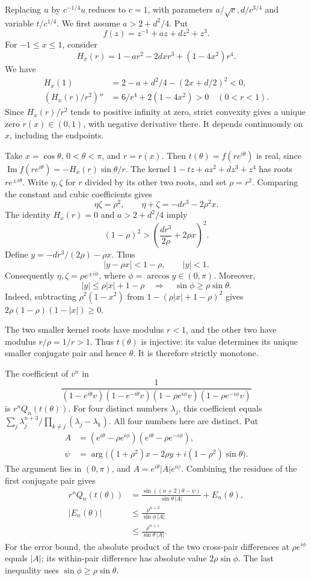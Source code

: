 \begin{proof*}
Replacing $u$ by $c^{-1/4}u$ reduces to $c=1$,
with parameters $a/\sqrt c,d/c^{3/4}$ and variable $t/c^{1/4}$.
We first assume $a>2+d^2/4$. Put
\[
 f(z)=z^{-1}+az+dz^2+z^3.
\]
For $-1\leq x\leq1$, consider
\[
 H_x(r)=1-ar^2-2dxr^3+(1-4x^2)r^4.
\]
We have
\begin{align*}
 H_x(1)&=2-a+d^2/4-(2x+d/2)^2<0,\\
 (H_x(r)/r^2)''&=6/r^4+2(1-4x^2)>0\quad(0<r<1).
\end{align*}
Since $H_x(r)/r^2$ tends to positive infinity at zero, strict convexity
gives a unique zero $r(x)\in(0,1)$, with negative derivative there.
It depends continuously on $x$, including the endpoints.

Take $x=\cos\theta$, $0<\theta<\pi$, and $r=r(x)$.
Then $t(\theta)=f(re^{i\theta})$ is real, since
$\operatorname{Im}f(re^{i\theta})=-H_x(r)\sin\theta/r$.
The kernel $1-tz+az^2+dz^3+z^4$ has roots $re^{\pm i\theta}$.
Write $\eta,\zeta$ for $r$ divided by its other two roots, and set
$\rho=r^2$. Comparing the constant and cubic coefficients gives
\[
 \eta\zeta=\rho^2,\qquad
 \eta+\zeta=-dr^3-2\rho^2x.
\]
The identity $H_x(r)=0$ and $a>2+d^2/4$ imply
\[
 (1-\rho)^2>
 \left(\frac{dr^3}{2\rho}+2\rho x\right)^2.
\]
Define $y=-dr^3/(2\rho)-\rho x$. Thus
\[
 |y-\rho x|<1-\rho,\qquad |y|<1.
\]
Consequently $\eta,\zeta=\rho e^{\pm i\phi}$, where
$\phi=\arccos y\in(0,\pi)$. Moreover,
\[
 |y|\leq\rho|x|+1-\rho
 \quad\Longrightarrow\quad
 \sin\phi\geq\rho\sin\theta.
\]
Indeed, subtracting $\rho^2(1-x^2)$ from
$1-(\rho|x|+1-\rho)^2$ gives
$2\rho(1-\rho)(1-|x|)\geq0$.

The two smaller kernel roots have modulus $r<1$, and the other two
have modulus $r/\rho=1/r>1$. Thus $t(\theta)$ is injective:
its value determines its unique smaller conjugate pair and hence $\theta$.
It is therefore strictly monotone.

The coefficient of $v^n$ in
\[
 \frac1{(1-e^{i\theta}v)(1-e^{-i\theta}v)
 (1-\rho e^{i\phi}v)(1-\rho e^{-i\phi}v)}
\]
is $r^nQ_n(t(\theta))$. For four distinct numbers $\lambda_j$,
this coefficient equals
$\sum_j\lambda_j^{n+3}/\prod_{k\ne j}(\lambda_j-\lambda_k)$.
All four numbers here are distinct. Put
\begin{align*}
 A&=(e^{i\theta}-\rho e^{i\phi})(e^{i\theta}-\rho e^{-i\phi}),\\
 \psi&=\arg\bigl((1+\rho^2)x-2\rho y
                 +i(1-\rho^2)\sin\theta\bigr).
\end{align*}
The argument lies in $(0,\pi)$, and $A=e^{i\theta}|A|e^{i\psi}$.
Combining the residues of the first conjugate pair gives
\begin{align*}
 r^nQ_n(t(\theta))
 &=\frac{\sin((n+2)\theta-\psi)}{\sin\theta\,|A|}+E_n(\theta),\\
 |E_n(\theta)|&\leq\frac{\rho^{n+2}}{\sin\phi\,|A|}\\
 &\leq\frac{\rho^{n+1}}{\sin\theta\,|A|}.
\end{align*}
For the error bound, the absolute product of the two cross-pair differences
at $\rho e^{i\phi}$ equals $|A|$; its within-pair difference has
absolute value $2\rho\sin\phi$. The last inequality uses $\sin\phi\geq\rho\sin\theta$.


\end{proof*}
